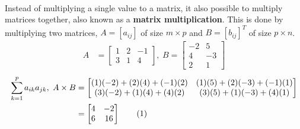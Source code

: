 \documentclass[11pt]{article}
\newcommand\numberthis{\addtocounter{equation}{1}\tag{\theequation}}%
\begin{document}
\paragraph[Matrix Multiplication]{} Instead of multiplying a single value to a matrix, it also possible to multiply matrices together, also known as a \textbf{matrix multiplication}. This is done by multiplying two matrices, $A=[a_{ij}]$ of size $m\times p$ and $B=[b_{ij}]^{T}$ of size $p\times n$.
{ \small
	\begin{align*}
	A&=
	\begin{bmatrix}
	1 & 2 & -1\\
	3 & 1 & 4
	\end{bmatrix}
	,\hspace{3pt}
	B=
	\begin{bmatrix}
	-2 & 5 \\
	4 & -3 \\
	2 & 1
	\end{bmatrix}
	\end{align*}
	\begin{align*}
	\sum_{k=1}^{p}a_{ik}a_{jk},\hspace{3pt}
	A\times B &=
	\begin{bmatrix}
	(1)(-2)+(2)(4)+(-1)(2) & (1)(5)+(2)(-3)+(-1)(1)\\
	(3)(-2)+(1)(4)+(4)(2) & (3)(5)+(1)(-3)+(4)(1)
	\end{bmatrix}
	\\
	&=
	\begin{bmatrix}
	4 & -2\\
	6 & 16
	\end{bmatrix} \numberthis \label{equ:MatrixMultiplication}
	\end{align*}
}
\end{document}
